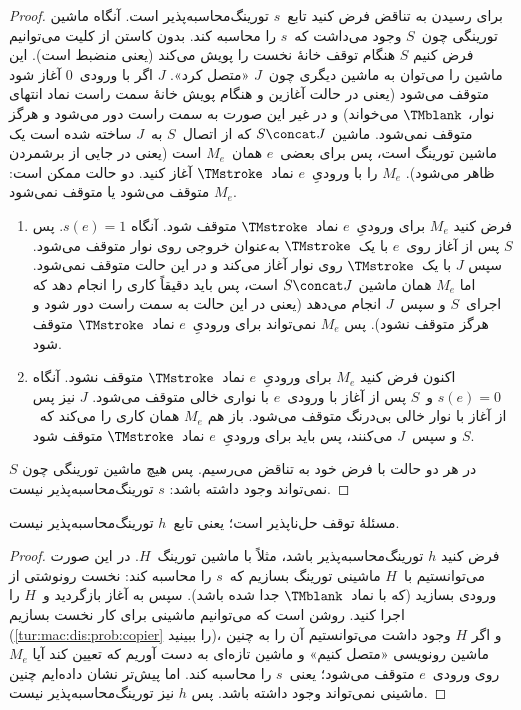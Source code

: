 \documentclass[../../../include/open-logic-section]{subfiles}
\begin{document}
\begin{proof}
برای رسیدن به تناقض فرض کنید تابع~$s$ تورینگ‌محاسبه‌پذیر است. آنگاه
ماشین تورینگی چون~$S$ وجود می‌داشت که~$s$ را محاسبه کند. بدون کاستن
از کلیت می‌توانیم فرض کنیم $S$ هنگام توقف خانهٔ نخست را پویش می‌کند
(یعنی منضبط است). این ماشین را می‌توان به ماشین دیگری چون~$J$ «متصل
کرد». $J$ اگر با ورودی~$0$ آغاز شود متوقف می‌شود (یعنی در حالت آغازین
و هنگام پویش خانهٔ سمت راست نماد انتهای نوار، $\TMblank$ می‌خواند) و
در غیر این صورت به سمت راست دور می‌شود و هرگز متوقف نمی‌شود. ماشین
$S\concat J$ که از اتصال~$S$ به~$J$ ساخته شده است یک ماشین تورینگ است،
پس برای بعضی~$e$ همان~$M_e$ است (یعنی در جایی از برشمردن ظاهر می‌شود).
$M_e$ را با ورودیِ~$e$ نماد~$\TMstroke$ آغاز کنید. دو حالت ممکن است:
$M_e$ متوقف می‌شود یا متوقف نمی‌شود.
\begin{enumerate}
\item فرض کنید $M_e$ برای ورودیِ~$e$ نماد~$\TMstroke$ متوقف شود.
  آنگاه $s(e)=1$. پس $S$ پس از آغاز روی~$e$ با یک~$\TMstroke$ به‌عنوان
  خروجی روی نوار متوقف می‌شود. سپس $J$ با یک~$\TMstroke$ روی نوار آغاز
  می‌کند و در این حالت متوقف نمی‌شود. اما $M_e$ همان ماشین
  $S\concat J$ است، پس باید دقیقاً کاری را انجام دهد که اجرای~$S$ و
  سپس~$J$ انجام می‌دهد (یعنی در این حالت به سمت راست دور شود و هرگز
  متوقف نشود). پس $M_e$ نمی‌تواند برای ورودیِ~$e$ نماد~$\TMstroke$
  متوقف شود.

\item اکنون فرض کنید $M_e$ برای ورودیِ~$e$ نماد~$\TMstroke$ متوقف
  نشود. آنگاه $s(e)=0$ و~$S$ پس از آغاز با ورودی~$e$ با نواری خالی
  متوقف می‌شود. $J$ نیز پس از آغاز با نوار خالی بی‌درنگ متوقف می‌شود.
  باز هم $M_e$ همان کاری را می‌کند که~$S$ و سپس~$J$ می‌کنند، پس باید
  برای ورودیِ~$e$ نماد~$\TMstroke$ متوقف شود.
\end{enumerate}
در هر دو حالت با فرض خود به تناقض می‌رسیم. پس هیچ ماشین تورینگی چون
$S$ نمی‌تواند وجود داشته باشد: $s$ تورینگ‌محاسبه‌پذیر نیست.
\end{proof}

\begin{thm}
 مسئلهٔ توقف حل‌ناپذیر است؛ یعنی تابع~$h$
تورینگ‌محاسبه‌پذیر نیست.
\end{thm}

\begin{proof}
فرض کنید $h$ تورینگ‌محاسبه‌پذیر باشد، مثلاً با ماشین تورینگ~$H$. در
این صورت می‌توانستیم با~$H$ ماشینی تورینگ بسازیم که~$s$ را محاسبه
کند: نخست رونوشتی از ورودی بسازید (که با نماد~$\TMblank$ جدا شده
باشد). سپس به آغاز بازگردید و~$H$ را اجرا کنید. روشن است که می‌توانیم
ماشینی برای کار نخست بسازیم (\cref{tur:mac:dis:prob:copier} را
ببینید)، و اگر $H$ وجود داشت می‌توانستیم آن را به چنین ماشین
رونویسی «متصل کنیم» و ماشین تازه‌ای به دست آوریم که تعیین کند آیا
$M_e$ روی ورودی~$e$ متوقف می‌شود؛ یعنی~$s$ را محاسبه کند. اما پیش‌تر
نشان داده‌ایم چنین ماشینی نمی‌تواند وجود داشته باشد. پس $h$ نیز
تورینگ‌محاسبه‌پذیر نیست.
\end{proof}
\end{document}
